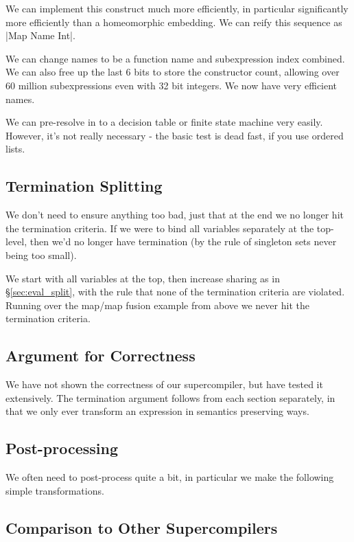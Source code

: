 \documentclass{sigplanconf}
\begin{document}
We can implement this construct much more efficiently, in particular significantly more efficiently than a homeomorphic embedding. We can reify this sequence as |Map Name Int|.

We can change names to be a function name and subexpression index combined. We can also free up the last 6 bits to store the constructor count, allowing over 60 million subexpressions even with 32 bit integers. We now have very efficient names.

We can pre-resolve in to a decision table or finite state machine very easily. However, it's not really necessary - the basic test is dead fast, if you use ordered lists.

\subsection{Termination Splitting}
\label{sec:term_split}

We don't need to ensure anything too bad, just that at the end we no longer hit the termination criteria. If we were to bind all variables separately at the top-level, then we'd no longer have termination (by the rule of singleton sets never being too small).

We start with all variables at the top, then increase sharing as in \S\ref{sec:eval_split}, with the rule that none of the termination criteria are violated. Running over the map/map fusion example from above we never hit the termination criteria.

\subsection{Argument for Correctness}

We have not shown the correctness of our supercompiler, but have tested it extensively. The termination argument follows from each section separately, in that we only ever transform an expression in semantics preserving ways.

\subsection{Post-processing}

We often need to post-process quite a bit, in particular we make the following simple transformations.

\subsection{Comparison to Other Supercompilers}
\label{sec:comparison}
\end{document}
